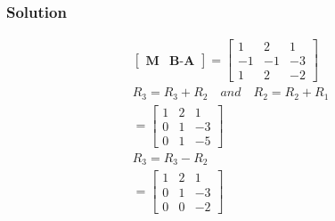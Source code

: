 \documentclass{beamer}
\begin{document}
\begin{frame}
\frametitle{Solution}
\begin{align}
   \begin{bmatrix}\textbf{M} & \textbf{B-A}\end{bmatrix} = \begin{bmatrix}1 & 2 & 1 \\ -1 & -1 & -3\\1 & 2 & -2\end{bmatrix}\\
 R_3 = R_3 + R_2 \quad and \quad  R_2 = R_2 + R_1\\
 = \begin{bmatrix}1 & 2 & 1 \\ 0 & 1 & -3\\0 & 1 & -5\end{bmatrix}\\
    R_3 = R_3  - R_2 \\
 = \begin{bmatrix}1 & 2 & 1 \\ 0 & 1 & -3\\0 & 0 & -2\end{bmatrix}
\end{align}
\end{frame}
\end{document}
